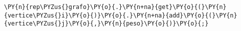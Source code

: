 \begin{Verbatim}[commandchars=\\\{\}]
\PY{n}{rep\PYZus{}grafo}\PY{o}{.}\PY{n+na}{get}\PY{o}{(}\PY{n}{vertice\PYZus{}i}\PY{o}{)}\PY{o}{.}\PY{n+na}{add}\PY{o}{(}\PY{n}{vertice\PYZus{}j}\PY{o}{,}\PY{n}{peso}\PY{o}{)}\PY{o}{;}
\end{Verbatim}
